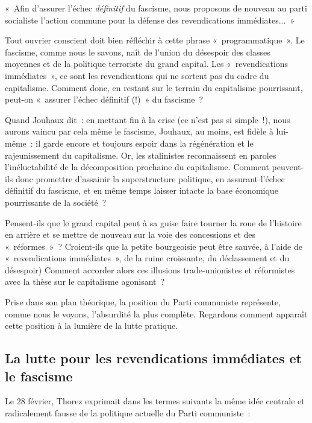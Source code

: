 \documentclass[french,twoside]{book} %
\newenvironment{quoteblock}%
  {\begin{quoting}}
  {\end{quoting}}
\newenvironment{quotebar}{%
    \def\FrameCommand{{\color{rubric!10!}\vrule width 0.5em} \hspace{0.9em}}%
    \def\OuterFrameSep{\itemsep} %
    \MakeFramed {\advance\hsize-\width \FrameRestore}
  }%
  {%
    \endMakeFramed
  }
\renewenvironment{quoteblock}%
  {%
    \savenotes
    \setstretch{0.9}
    \normalfont
    \begin{quotebar}
  }
  {%
    \end{quotebar}
    \spewnotes
  }
\begin{document}
\begin{quoteblock}
 \noindent « Afin d’assurer l’échec \emph{définitif} du fascisme, nous proposons de nouveau au parti socialiste  l’action commune pour la défense des revendications immédiates... »
 \end{quoteblock}

\noindent Tout ouvrier conscient doit bien réfléchir à cette phrase « programmatique ». Le fascisme, comme nous le savons, naît de l’union du désespoir des classes moyennes et de la politique terroriste du grand capital. Les « revendications immédiates », ce sont les revendications qui ne sortent pas du cadre du capitalisme. Comment donc, en restant sur le terrain du capitalisme pourrissant, peut-on « assurer l’échec définitif (!) » du fascisme ?\par
Quand Jouhaux dit : en mettant fin à la crise (ce n’est pas si simple !), nous aurons vaincu par cela même le fascisme, Jouhaux, au moins, est fidèle à lui-même : il garde encore et toujours espoir dans la régénération et le rajeunissement du capitalisme. Or, les stalinistes reconnaissent en paroles l’inéluctabilité de la décomposition prochaine du capitalisme. Comment peuvent-ils donc promettre d’assainir la superstructure politique, en assurant l’échec définitif du fascisme, et en même temps laisser intacte la base économique pourrissante de la société ?\par
Pensent-ils que le grand capital peut à sa guise faire tourner la roue de l’histoire en arrière et se mettre de nouveau sur la voie des concessions et des « réformes » ? Croient-ils que la petite bourgeoisie peut être sauvée, à l’aide de « revendications immédiates », de la ruine croissante, du déclassement et du désespoir) Comment accorder alors ces illusions trade-unionistes et réformistes avec la thèse sur le capitalisme agonisant ?\par
Prise dans son plan théorique, la position du Parti communiste représente, comme nous le voyons, l’absurdité la plus complète. Regardons comment apparaît cette position à la lumière de la lutte pratique.
 \subsection[{La lutte pour les revendications immédiates et le fascisme}]{La lutte pour les revendications immédiates et le fascisme}
\noindent Le 28 février, Thorez exprimait dans les termes suivants la même idée centrale et radicalement fausse de la politique actuelle du Parti communiste :\par
\end{document}
